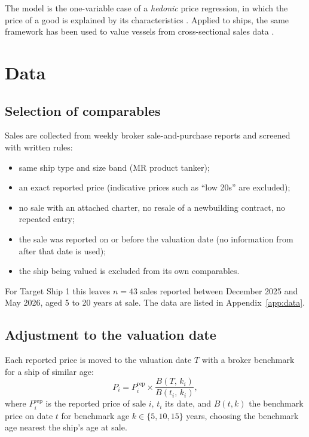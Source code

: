 \documentclass[11pt,a4paper]{article}
\newcommand{\usd}[1]{\text{US\$}#1}
\begin{document}
The model is the one-variable case of a \emph{hedonic} price regression, in which the price of a good is explained by its characteristics \citep{Court1939,Griliches1961,Rosen1974}. Applied to ships, the same framework has been used to value vessels from cross-sectional sales data \citep{AdlandKoekebakker2007}.

\section{Data}

\subsection{Selection of comparables}

Sales are collected from weekly broker sale-and-purchase reports and screened with written rules:
\begin{itemize}
\item same ship type and size band (MR product tanker);
\item an exact reported price (indicative prices such as ``low \usd{20}s'' are excluded);
\item no sale with an attached charter, no resale of a newbuilding contract, no repeated entry;
\item the sale was reported on or before the valuation date (no information from after that date is used);
\item the ship being valued is excluded from its own comparables.
\end{itemize}
For Target Ship 1 this leaves $n = 43$ sales reported between December 2025 and May 2026, aged 5 to 20 years at sale. The data are listed in Appendix~\ref{app:data}.

\subsection{Adjustment to the valuation date}

Each reported price is moved to the valuation date $T$ with a broker benchmark for a ship of similar age:
\begin{equation}
\label{eq:index}
P_i = P_i^{\text{rep}} \times \frac{B(T,\,k_i)}{B(t_i,\,k_i)},
\end{equation}
where $P_i^{\text{rep}}$ is the reported price of sale $i$, $t_i$ its date, and $B(t,k)$ the benchmark price on date $t$ for benchmark age $k \in \{5, 10, 15\}$ years, choosing the benchmark age nearest the ship's age at sale.
\end{document}
